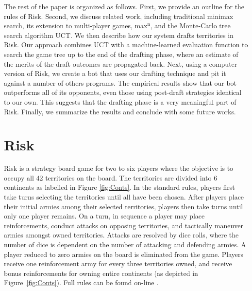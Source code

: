 \documentclass[letterpaper]{article}
\numberwithin{equation}{section}
\numberwithin{theorem}{section}
\numberwithin{lemma}{section}
\numberwithin{df}{section}
\begin{document}
The rest of the paper is organized as follows.  First, we provide an outline for the rules of Risk.  Second, we discuss related work, including traditional minimax search, its extension to multi-player games, max$^\text{n}$, and the Monte-Carlo tree search algorithm UCT.  We then describe how our system drafts territories in Risk.  Our approach combines UCT with a machine-learned evaluation function to search the game tree up to the end of the drafting phase, where an estimate of the merits of the draft outcomes are propagated back.  Next, using a computer version of Risk, we create a bot that uses our drafting technique and pit it against a number of others programs.  The empirical results show that our bot outperforms all of its opponents, even those using post-draft strategies identical to our own.  This suggests that the drafting phase is a very meaningful part of Risk.  Finally, we summarize the results and conclude with some future works.

\section{Risk}
\label{sec:Prob}

Risk is a strategy board game for two to six players where the objective is to occupy all 42 territories on the board.  The territories are divided into 6 continents as labelled in Figure \ref{fig:Conts}.  In the standard rules, players first take turns selecting the territories until all have been chosen.  After players place their initial armies among their selected territories, players then take turns until only one player remains.  On a turn, in sequence a player may place reinforcements, conduct attacks on opposing territories, and tactically maneuver armies amongst owned territories.  Attacks are resolved by dice rolls, where the number of dice is dependent on the number of attacking and defending armies.  A player reduced to zero armies on the board is eliminated from the game.  Players receive one reinforcement army for every three territories owned, and receive bonus reinforcements for owning entire continents (as depicted in Figure~\ref{fig:Conts}). %
Full rules can be found on-line \cite{Risk}.
\end{document}
